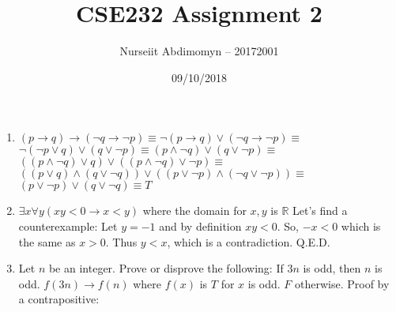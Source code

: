 \documentclass[12pt]{article}
\title{CSE232 Assignment 2}
\author{Nurseiit Abdimomyn -- 20172001}
\date{09/10/2018}
\begin{document}
\maketitle

\begin{enumerate}
  \item
    $(p \to q) \to (\neg q \to \neg p) \equiv \neg (p \to q) \lor (\neg q \to \neg p) \equiv$
    \newline
    $\neg (\neg p \lor q) \lor (q \lor \neg p) \equiv (p \land \neg q) \lor (q \lor \neg p) \equiv$
    \newline
    $((p \land \neg q) \lor q) \lor ((p \land \neg q) \lor \neg p) \equiv$
    \newline
    $((p \lor q) \land (q \lor \neg q)) \lor ((p \lor \neg p) \land (\neg q \lor \neg p)) \equiv$
    \newline
    $(p \lor \neg p) \lor (q \lor \neg q) \equiv T$
  \item
    $\exists x \forall y (xy < 0 \to x < y)$ where the domain for $x, y$ is $\mathbb{R}$
    \newline
    Let's find a counterexample:
    \newline
    Let $y = -1$ and by definition $xy < 0$. So, $-x < 0$ which is the same as $x > 0$. Thus $y < x$, which is a contradiction. Q.E.D.
  \item
    Let $n$ be an integer.  Prove or disprove the following:  If $3n$ is odd, then $n$ is odd.
    \newline
    $f(3n) \to f(n)$ where $f(x)$ is $T$ for $x$ is odd. $F$ otherwise.
    \newline
    Proof by a contrapositive:
    \newline
    
\end{enumerate}
\end{document}

